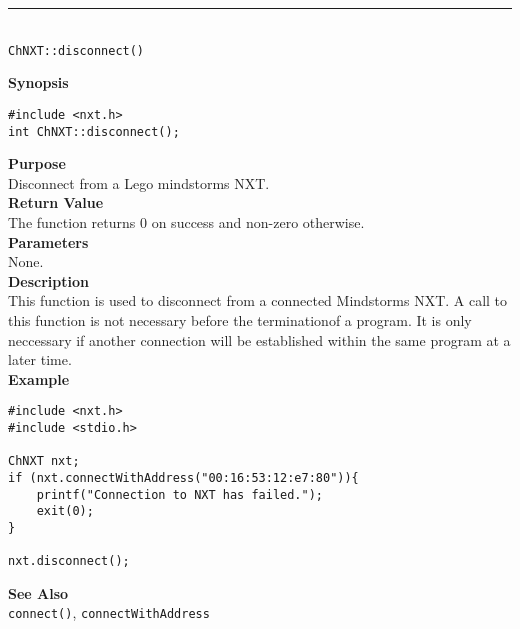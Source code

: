 \noindent
\vspace{5pt}
\rule{4.5in}{0.015in}\\
\noindent
{\LARGE \texttt{ChNXT::disconnect()} }\\


\noindent
{\bf Synopsis}
\vspace{-8pt}
\begin{verbatim}
#include <nxt.h>
int ChNXT::disconnect();
\end{verbatim}

\noindent
{\bf Purpose}\\
Disconnect from a Lego mindstorms NXT.\\

\noindent
{\bf Return Value}\\
The function returns 0 on success and non-zero otherwise.\\

\noindent
{\bf Parameters}\\
None.\\

\noindent
{\bf Description}\\
This function is used to disconnect from a connected Mindstorms NXT. A call to this function is not necessary before the terminationof a program. It is only neccessary if another connection will be established within the same program at a later time.\\

\noindent
{\bf Example}
\begin{verbatim}
#include <nxt.h> 
#include <stdio.h>

ChNXT nxt;
if (nxt.connectWithAddress("00:16:53:12:e7:80")){
    printf("Connection to NXT has failed.");
    exit(0);
}
    
nxt.disconnect();
\end{verbatim}

\noindent
{\bf See Also}\\
\texttt{connect()}, \texttt{connectWithAddress}\\
